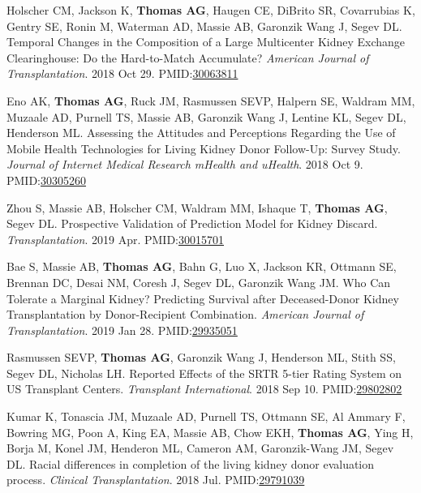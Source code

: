 \documentclass[10pt]{article}
\makeatletter
\newlength{\bibhang}
\newlength{\bibsep}
 {\@listi \global\bibsep\itemsep \global\advance\bibsep by\parsep}
\newenvironment{bibenum*}
  {\renewcommand\labelenumi{[\theenumi]}%
   \etaremune[
     topsep=0pt,
     itemsep=\bibsep,
     parsep=0pt,partopsep=0pt,
     itemindent=-\bibhang,
     leftmargin={\bibhang+\widthof{[999]}}]}
  {\endetaremune}
\newcommand{\pmid}[1]{PMID:\href{https://www.ncbi.nlm.nih.gov/pubmed/#1}{#1}}
\makeatother
\begin{document}
\begin{bibenum*}
\item Holscher CM, Jackson K, \textbf{Thomas AG}, Haugen CE, DiBrito SR,
  Covarrubias K, Gentry SE, Ronin M, Waterman AD, Massie AB,
  Garonzik Wang J, Segev DL.
  Temporal Changes in the Composition of a Large Multicenter Kidney
  Exchange Clearinghouse: Do the Hard-to-Match Accumulate?
  \emph{American Journal of Transplantation}. 2018 Oct 29.
  \pmid{30063811} 

\item Eno AK, \textbf{Thomas AG}, Ruck JM, Rasmussen SEVP,
  Halpern SE, Waldram MM, Muzaale AD, Purnell TS, Massie AB,
  Garonzik Wang J, Lentine KL, Segev DL, Henderson ML.
  Assessing the Attitudes and Perceptions Regarding the Use of Mobile Health 
  Technologies for Living Kidney Donor Follow-Up: Survey Study.
  \emph{Journal of Internet Medical Research mHealth and uHealth}.
  2018 Oct 9.
  \pmid{30305260} 

\item Zhou S, Massie AB, Holscher CM, Waldram MM, Ishaque T,
  \textbf{Thomas AG}, Segev DL. Prospective Validation of Prediction
  Model for Kidney Discard.
  \emph{Transplantation}. 2019 Apr.
  \pmid{30015701} 

\item Bae S, Massie AB, \textbf{Thomas AG}, Bahn G, Luo X, Jackson KR,
  Ottmann SE, Brennan DC, Desai NM, Coresh J, Segev DL, Garonzik Wang JM.
  Who Can Tolerate a Marginal Kidney? Predicting Survival after
  Deceased-Donor Kidney Transplantation by Donor-Recipient Combination.
  \emph{American Journal of Transplantation}. 2019 Jan 28.
  \pmid{29935051} 

\item Rasmussen SEVP, \textbf{Thomas AG}, Garonzik Wang J,
  Henderson ML, Stith SS, Segev DL, Nicholas LH. Reported Effects
  of the SRTR 5-tier Rating System on US Transplant Centers.
  \emph{Transplant International}. 2018 Sep 10.
  \pmid{29802802} 

\item Kumar K, Tonascia JM, Muzaale AD, Purnell TS, Ottmann SE,
  Al Ammary F, Bowring MG, Poon A, King EA, Massie AB, Chow EKH,
  \textbf{Thomas AG}, Ying H, Borja M, Konel JM, Henderon ML,
  Cameron AM, Garonzik-Wang JM, Segev DL. Racial differences in
  completion of the living kidney donor evaluation process.
  \emph{Clinical Transplantation}. 2018 Jul.
  \pmid{29791039} 


\end{bibenum*}
\end{document}
